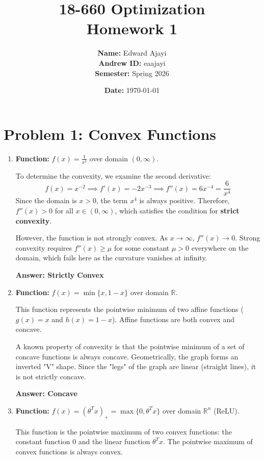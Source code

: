 \documentclass[12pt]{article}
\title{18-660 Optimization \\ Homework 1}
\author{\textbf{Name:} Edward Ajayi \\ \textbf{Andrew ID:} eaajayi \\ \textbf{Semester: }Spring 2026} %
\date{\textbf{Date: }\today}
\begin{document}
\maketitle
\newpage

\section*{Problem 1: Convex Functions}

\begin{enumerate}
    \item[(a)] \textbf{Function:} $f(x) = \frac{1}{x^2}$ over domain $(0, \infty)$.
    
    To determine the convexity, we examine the second derivative:
    $$ f(x) = x^{-2} \implies f'(x) = -2x^{-3} \implies f''(x) = 6x^{-4} = \frac{6}{x^4} $$
    Since the domain is $x > 0$, the term $x^4$ is always positive. Therefore, $f''(x) > 0$ for all $x \in (0, \infty)$, which satisfies the condition for \textbf{strict convexity}.
    
    However, the function is not strongly convex. As $x \to \infty$, $f''(x) \to 0$. Strong convexity requires $f''(x) \ge \mu$ for some constant $\mu > 0$ everywhere on the domain, which fails here as the curvature vanishes at infinity.
    
    \textbf{Answer: Strictly Convex}

    \item[(b)] \textbf{Function:} $f(x) = \min\{x, 1-x\}$ over domain $\mathbb{R}$.
    
    This function represents the pointwise minimum of two affine functions ($g(x)=x$ and $h(x)=1-x$). Affine functions are both convex and concave. 
    
    A known property of convexity is that the pointwise minimum of a set of concave functions is always concave. Geometrically, the graph forms an inverted "V" shape. Since the "legs" of the graph are linear (straight lines), it is not strictly concave.
    
    \textbf{Answer: Concave}

    \item[(c)] \textbf{Function:} $f(x) = (\theta^T x)_+ = \max\{0, \theta^T x\}$ over domain $\mathbb{R}^n$ (ReLU).
    
    This function is the pointwise maximum of two convex functions: the constant function $0$ and the linear function $\theta^T x$. The pointwise maximum of convex functions is always convex.
    

\end{enumerate}
\end{document}
